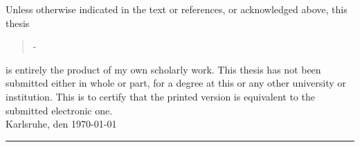 Unless otherwise indicated in the text or references, or acknowledged above, this thesis 
\begin{quote}
\textit{\titel} -\textit{ \untertitel }
\end{quote}
is entirely the product of my own scholarly work. This thesis has not been submitted either in whole or part, for a degree at this or any other university or institution. This is to certify that the printed version is equivalent to the submitted electronic one.\\[10ex]

Karlsruhe, den \today \\[4ex]


\rule[-0.2cm]{5cm}{0.5pt} \\

\textsc{\autor} \\[10ex]

